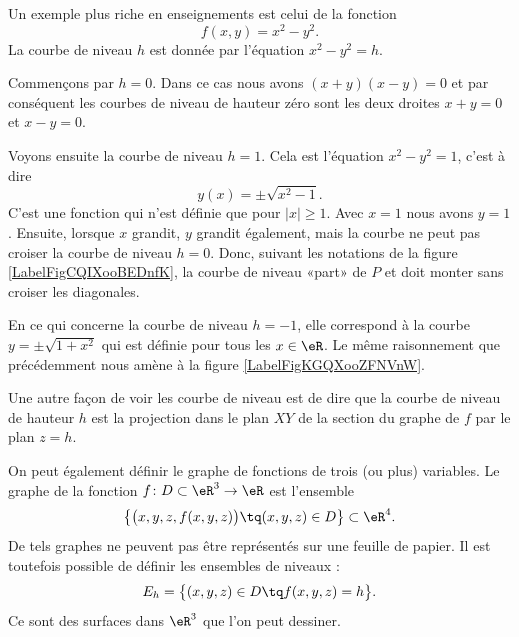 \begin{example}
    Un exemple plus riche en enseignements est celui de la fonction
    \begin{equation}
        f(x,y)=x^2-y^2.
    \end{equation}
    La courbe de niveau $h$ est donnée par l'équation $x^2-y^2=h$.

    Commençons par $h=0$. Dans ce cas nous avons $(x+y)(x-y)=0$ et par conséquent les courbes de niveau de hauteur zéro sont les deux droites $x+y=0$ et $x-y=0$.

    Voyons ensuite la courbe de niveau $h=1$. Cela est l'équation $x^2-y^2=1$, c'est à dire
    \begin{equation}
        y(x)=\pm\sqrt{x^2-1}.
    \end{equation}
    C'est une fonction qui n'est définie que pour $| x |\geq 1$. Avec $x=1$ nous avons $y=1$. Ensuite, lorsque $x$ grandit, $y$ grandit également, mais la courbe ne peut pas croiser la courbe de niveau $h=0$. Donc, suivant les notations de la figure \ref{LabelFigCQIXooBEDnfK}, la courbe de niveau «part» de $P$ et doit monter sans croiser les diagonales.


\newcommand{\CaptionFigCQIXooBEDnfK}{La courbe de niveau $h=1$ de $x^2-y^2$. Notez qu'elle est en deux morceaux.}


\newcommand{\CaptionFigKGQXooZFNVnW}{La courbe de niveau $x^2-y^2=-1$.}


    En ce qui concerne la courbe de niveau $h=-1$, elle correspond à la courbe $y=\pm\sqrt{1+x^2}$ qui est définie pour tous les $x\in\eR$. Le même raisonnement que précédemment nous amène à la figure \ref{LabelFigKGQXooZFNVnW}.

\end{example}

Une autre façon de voir les courbe de niveau est de dire que la courbe de niveau de hauteur $h$ est la projection dans le plan $XY$ de la section du graphe de $f$ par le plan $z=h$.

On peut également définir le graphe de fonctions de trois (ou plus) variables. Le graphe de la fonction $f\colon D\subset\eR^3\to \eR$ est l'ensemble
\begin{equation}
    \big\{ \big( x,y,z,f(x,y,z) \big)\tq (x,y,z)\in D \big\}\subset \eR^4.
\end{equation}
De tels graphes ne peuvent pas être représentés sur une feuille de papier. Il est toutefois possible de définir les ensembles de niveaux :
\begin{equation}
    E_h=\big\{ (x,y,z)\in D\tq  f(x,y,z)=h\big\}.
\end{equation}
Ce sont des surfaces dans $\eR^3$ que l'on peut dessiner.

